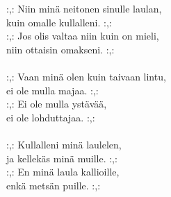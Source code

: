 
:,: Niin minä neitonen sinulle laulan, \\ kuin omalle kullalleni. :,: \\ :,: Jos olis valtaa niin kuin on mieli, \\ niin ottaisin omakseni. :,: \\ \hspace{10mm} \\ :,: Vaan minä olen kuin taivaan lintu, \\ ei ole mulla majaa. :,: \\ :,: Ei ole mulla ystävää, \\ ei ole lohduttajaa. :,: \\ \hspace{10mm} \\ :,: Kullalleni minä laulelen, \\ ja kellekäs minä muille. :,: \\ :,: En minä laula kallioille, \\ enkä metsän puille. :,: